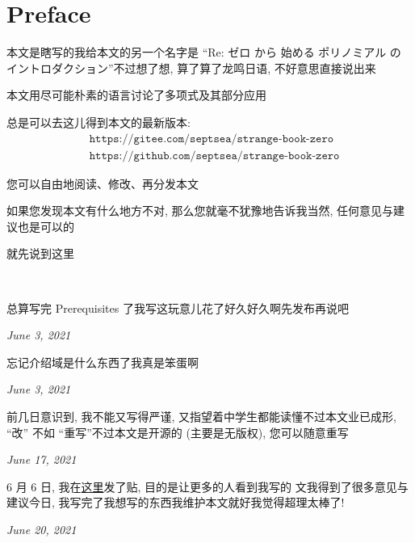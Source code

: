 \section*{Preface}

本文是瞎写的\period 我给本文的另一个名字是 ``Re: ゼロ から 始める ポリノミアル の イントロダクション''\period 不过想了想, 算了算了\period 龙鸣日语, 不好意思直接说出来\period

本文用尽可能朴素的语言讨论了多项式及其部分应用\period

总是可以去这儿得到本文的最新版本:
\begin{align*}
     & \texttt{https://gitee.com/septsea/strange-book-zero}  \\
     & \texttt{https://github.com/septsea/strange-book-zero}
\end{align*}

您可以自由地阅读、修改、再分发本文\period

如果您发现本文有什么地方不对, 那么您就毫不犹豫地告诉我\period 当然, 任何意见与建议也是可以的\period

就先说到这里\period

\ \

\providecommand{\appendDate}{}
\renewcommand{\appendDate}[1]{\par \hfill {\itshape \sffamily #1}}

\begin{remark}
    总算写完 Prerequisites 了\period 我写这玩意儿花了好久好久啊\period 先发布再说吧\period
    \appendDate{June 3, 2021}
\end{remark}

\begin{remark}
    忘记介绍域是什么东西了\period 我真是笨蛋啊\period
    \appendDate{June 3, 2021}
\end{remark}

\begin{remark}
    前几日意识到, 我不能又写得严谨, 又指望着中学生都能读懂\period 不过本文业已成形, ``改'' 不如 ``重写''\period 不过本文是开源的 (主要是无版权), 您可以随意重写\period
    \appendDate{June 17, 2021}
\end{remark}

\begin{remark}
    6 月 6 日, 我在\hyperref{https://chaoli.club/index.php/6396}{}{}{这里}发了贴, 目的是让更多的人看到我写的  文\period 我得到了很多意见与建议\period 今日, 我写完了我想写的东西\period 我维护本文就好\period 我觉得超理太棒了!
    \appendDate{June 20, 2021}
\end{remark}
